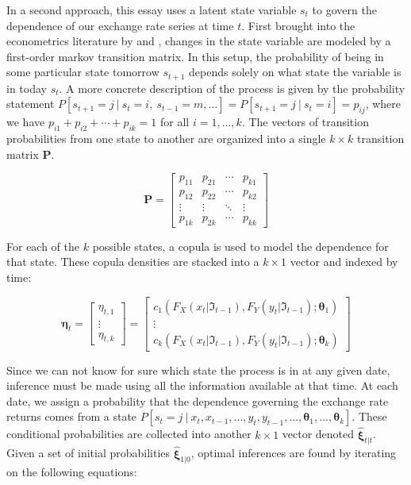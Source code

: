 \documentclass[12pt]{article}
\newcommand{\boldXi}{\hat{\boldsymbol{\xi}}}
\begin{document}
In a second approach, this essay uses a latent state variable $s_{t}$ to govern the dependence of our exchange rate series at time $t$. First brought into the econometrics literature by \cite{Hamilton_1989} and \cite{Hamilton_1994}, changes in the state variable are modeled by a first-order markov transition matrix. In this setup, the probability of being in some particular state tomorrow $s_{t+1}$ depends solely on what state the variable is in today $s_{t}$. A more concrete description of the process is given by the probability statement $P\left[s_{t + 1} = j~|~s_{t}=i,~s_{t-1} = m,\ldots \right] = P\left[s_{t+1}=j~|~s_{t} = i\right] = p_{ij}$, where we have $p_{i1} + p_{i2} + \cdots + p_{ik}=1$ for all $i = 1,...,k$. The vectors of transition probabilities from one state to another are organized into a single $k\times k$ transition matrix $\mathbf{P}$.

\begin{equation}
\mathbf{P}=\left[ 
\begin{array}{cccc}
p_{11} & p_{21} & \cdots & p_{k1} \\ 
p_{12} & p_{22} & \cdots & p_{k2} \\ 
\vdots & \vdots & \ddots & \vdots \\ 
p_{1k} & p_{2k} & \cdots & p_{kk}
\end{array}
\right]
\end{equation}

For each of the $k$ possible states, a copula is used to model the dependence for that state. These copula densities are stacked into a $k\times 1$ vector and indexed by time:

\begin{equation}
\boldsymbol{\eta}_{t} = \left[ 
\begin{array}{c}
\eta _{t,1} \\ 
\vdots \\ 
\eta _{t,k}
\end{array}
\right] = \left[
\begin{array}{c}
c_{1}\left(F_{X}\left(x_{t} | \Im_{t-1}\right), F_{Y}\left(y_{t} | \Im_{t-1}\right) ;\mathbf{\theta}_{1}\right) \\ 
\vdots \\ 
c_{k}\left(F_{X}\left(x_{t} | \Im_{t-1}\right), F_{Y}\left(y_{t} | \Im_{t-1}\right) ;\mathbf{\theta }_{k}\right)
\end{array}
\right]
\end{equation}

Since we can not know for sure which state the process is in at any given date, inference must be made using all the information available at that time. At each date, we assign a probability that the dependence governing the exchange rate returns comes from a state $P\left[s_{t}=j~|~x_{t},x_{t-1},...,y_{t},y_{t-1},...,\mathbf{\theta}_{1},...,\mathbf{\theta}_{k}\right]$. These conditional probabilities are collected into another $k\times 1$ vector denoted $\boldXi_{t|t}$. Given a set of initial probabilities $\boldXi_{1|0}$, optimal inferences are found by iterating on the following equations:
\end{document}
